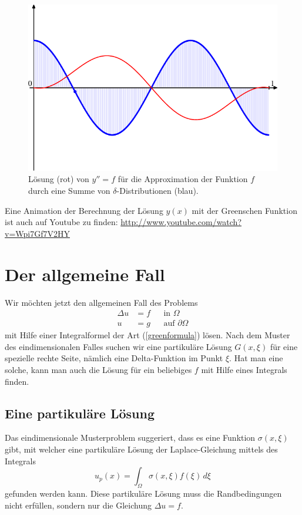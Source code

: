 \begin{beispiel}
\begin{figure}
\begin{center}
\includegraphics[width=0.7\hsize]{../common/graphics/green-1082.pdf}
\end{center}
\caption{Lösung (rot) von $y''=f$ für die Approximation der Funktion $f$
durch eine Summe von $\delta$-Distributionen (blau).
\label{elliptisch:green-beispiele}}
\end{figure}

Eine Animation der Berechnung der Lösung $y(x)$ mit der Greenschen
Funktion ist auch auf Youtube zu finden: \url{http://www.youtube.com/watch?v=Wpi7Gf7V2HY}
\end{beispiel}

\section{Der allgemeine Fall}
Wir möchten jetzt den allgemeinen Fall des Problems
\begin{align*}
\Delta u&=f&&\text{in $\Omega$}\\
u&=g&&\text{auf $\partial\Omega$}
\end{align*}
mit Hilfe einer Integralformel der Art (\ref{greenformula}) 
lösen. Nach dem Muster des eindimensionalen Falles suchen
wir eine partikuläre Lösung $G(x,\xi)$ für eine spezielle rechte Seite,
nämlich eine Delta-Funktion im Punkt $\xi$.  Hat man eine
solche, kann man auch die Lösung für ein beliebiges $f$ mit
Hilfe eines Integrals finden.


\subsection{Eine partikuläre Lösung}
Das eindimensionale Musterproblem suggeriert, dass es eine
Funktion $\sigma(x,\xi)$ gibt, mit welcher eine partikuläre Lösung
der Laplace-Gleichung mittels des Integrals
\begin{equation}
u_p(x)=\int_\Omega \sigma(x,\xi)  f(\xi)\,d\xi
\label{singulaereloesunglaplace}
\end{equation}
gefunden werden kann.
Diese partikuläre Lösung muss die Randbedingungen nicht erfüllen,
sondern nur die Gleichung $\Delta u=f$.

